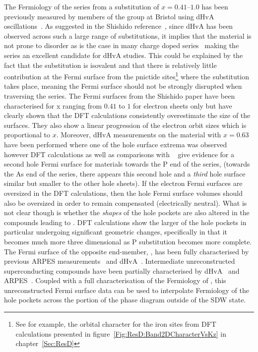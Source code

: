 The Fermiology of the \BaFeAsP{} series from a substitution of $x=0.41$--$1.0$ has been previously measured by members of the group at Bristol using dHvA oscillations~\cite{Shishido2010}. As suggested in the Shishido reference~\cite{Shishido2010}, since dHvA has been observed across such a large range of substitutions, it implies that the material is not prone to disorder as is the case in many charge doped series~\cite{VanderBeek2010} making the series an excellent candidate for dHvA studies. This could be explained by the fact that the substitution is isovalent and that there is relatively little contribution at the Fermi surface from the pnictide sites\footnote{See for example, the orbital character for the iron sites from \ac{DFT} calculations presented in figure~\ref{Fig:ResD:Band2DCharacterVsKz} in chapter~\ref{Sec:ResD}} where the substitution takes place, meaning the Fermi surface should not be strongly disrupted when traversing the series. The Fermi surfaces from the Shishido paper have been characterised for x ranging from $0.41$ to $1$ for electron sheets only but have clearly shown that the DFT calculations consistently overestimate the size of the surfaces. They also show a linear progression of the electron orbit sizes which is proportional to $x$. Moreover, dHvA measurements on the material with $x=0.63$ have been performed where one of the hole surface extrema was observed~\cite{Analytis2010c} however DFT calculations as well as comparisons with \SrFeP~\cite{Analytis2009} give evidence for a second hole Fermi surface for materials towards the P end of the series, (towards the As end of the series, there appears this second hole and a \emph{third} hole surface similar but smaller to the other hole sheets). If the electron Fermi surfaces are oversized in the DFT calculations, then the hole Fermi surface volumes should also be oversized in order to remain compensated (electrically neutral). What is not clear though is whether the \emph{shapes} of the hole pockets are also altered in the compounds leading to \BaFeP. DFT calculations show the larger of the hole pockets in particular undergoing significant geometric changes, specifically in that it becomes much more three dimensional as P substitution becomes more complete. The Fermi surface of the opposite end-member, \BaFeAs, has been fully characterised by previous \ac{ARPES} measurements~\cite{Kondo2010a} and dHvA~\cite{Terashima2011, Analytis2010b}. Intermediate unreconstructed superconducting compounds have been partially characterised by \ac{dHvA}~\cite{Analytis2010c} and \ac{ARPES}~\cite{Yoshida2010}. Coupled with a full characterisation of the Fermiology of \BaFeP, this unreconstructed Fermi surface data can be used to interpolate Fermiology of the hole pockets across the portion of the phase diagram outside of the \ac{SDW} state.

